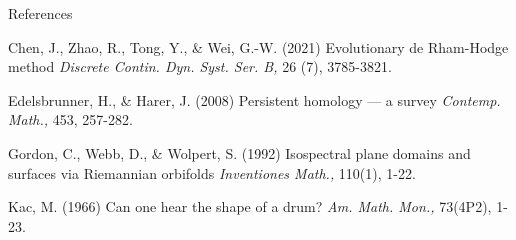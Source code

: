 \documentclass[aspectratio=169,xcolor=dvipsnames]{beamer}
\begin{document}






\begin{frame}{References}
    \footnotesize{
        \begin{thebibliography}{99}
             Chen, J., Zhao, R., Tong, Y., \& Wei, G.-W. (2021)
            \newblock Evolutionary de Rham-Hodge method
            \newblock \emph{Discrete Contin. Dyn. Syst. Ser. B,}  26 (7), 3785-3821.
        \end{thebibliography}
        \begin{thebibliography}{99}
             Edelsbrunner, H., \& Harer, J. (2008)
            \newblock Persistent homology — a survey
            \newblock \emph{Contemp. Math.,} 453, 257-282.
        \end{thebibliography}
        \begin{thebibliography}{99}
             Gordon, C., Webb, D., \& Wolpert, S. (1992)
            \newblock Isospectral plane domains and surfaces via Riemannian orbifolds
            \newblock \emph{Inventiones Math.,} 110(1), 1-22.
        \end{thebibliography}
        \begin{thebibliography}{99}
             Kac, M. (1966)
            \newblock Can one hear the shape of a drum?
            \newblock \emph{Am. Math. Mon.,} 73(4P2), 1-23.
        \end{thebibliography}
    }
\end{frame}
\end{document}
